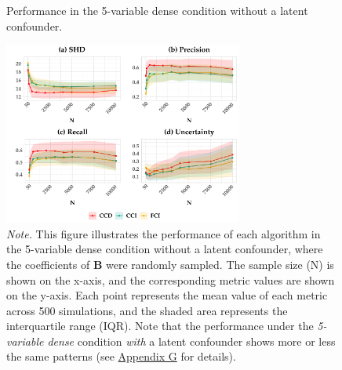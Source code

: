 \documentclass[twoside, 11pt]{article}
\newcommand*{\figref}[2][]{%
  \hyperref[{fig:#2}]{%
    Figure~\ref*{fig:#2}%
    \ifx\\#1\\%
    \else
      #1%
    \fi
  }%
}
\begin{document}

\begin{figure}[!t]
    \centering
        \caption{Performance in the 5-variable dense condition without a latent confounder.}
        \vspace{1mm}
        \includegraphics[width=0.7\textwidth]{figures/samplingbeta_dense5p.pdf}
        \caption*{\small{\textit{Note.} This figure illustrates the performance of each algorithm in the 5-variable dense condition without a latent confounder, where the coefficients of $\mathbf{B}$ were randomly sampled. The sample size (N) is shown on the x-axis, and the corresponding metric values are shown on the y-axis. Each point represents the mean value of each metric across 500 simulations, and the shaded area represents the interquartile range (IQR). Note that the performance under the \textit{5-variable dense} condition \textit{with} a latent confounder shows more or less the same patterns (see \hyperref[varyingbeta]{Appendix G} for details).}}
    \label{fig:5pdense}
\vspace{-3mm}
\end{figure}
\end{document}
